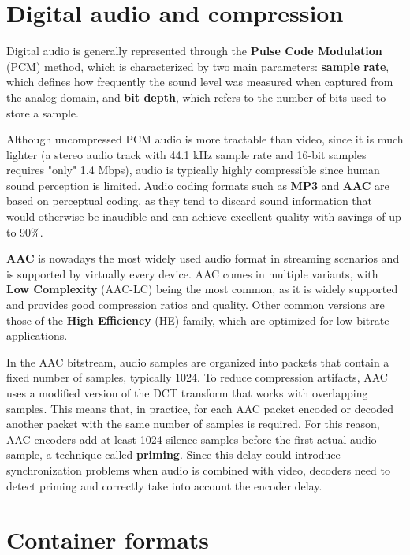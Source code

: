 \section{Digital audio and compression}
\label{sec:bg/audio}

Digital audio is generally represented through the \textbf{Pulse Code Modulation} (PCM) method, which is characterized by two main parameters: \textbf{sample rate}, which defines how frequently the sound level was measured when captured from the analog domain, and \textbf{bit depth}, which refers to the number of bits used to store a sample.

Although uncompressed PCM audio is more tractable than video, since it is much lighter (a stereo audio track with 44.1 kHz sample rate and 16-bit samples requires "only" 1.4 Mbps), audio is typically highly compressible since human sound perception is limited. Audio coding formats such as \textbf{MP3} and \textbf{AAC} are based on perceptual coding, as they tend to discard sound information that would otherwise be inaudible and can achieve excellent quality with savings of up to 90\%.\cite{aac}

\textbf{AAC} is nowadays the most widely used audio format in streaming scenarios and is supported by virtually every device.\cite{bitmovin} AAC comes in multiple variants, with \textbf{Low Complexity} (AAC-LC) being the most common, as it is widely supported and provides good compression ratios and quality. Other common versions are those of the \textbf{High Efficiency} (HE) family, which are optimized for low-bitrate applications.

In the AAC bitstream, audio samples are organized into packets that contain a fixed number of samples, typically 1024. To reduce compression artifacts, AAC uses a modified version of the DCT transform that works with overlapping samples. This means that, in practice, for each AAC packet encoded or decoded another packet with the same number of samples is required. For this reason, AAC encoders add at least 1024 silence samples before the first actual audio sample, a technique called \textbf{priming}. Since this delay could introduce synchronization problems when audio is combined with video, decoders need to detect priming and correctly take into account the encoder delay.\cite{aacpriming}

\section{Container formats}
\label{sec:bg/containers}

